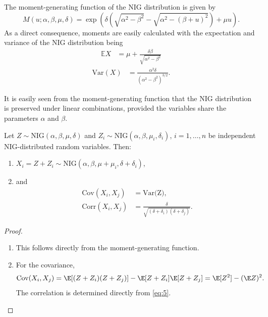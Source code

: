 The moment-generating function of the NIG distribution is given by
\begin{equation*}
  M(u; \alpha, \beta, \mu, \delta) = \exp\left( \delta
    \left(\sqrt{\alpha^2-\beta^2} - \sqrt{\alpha^2 - (\beta +
        u)^2}\right) + \mu u\right). 
\end{equation*}
As a direct consequence, moments are easily calculated with the
expectation and variance of the NIG distribution being
\begin{align*}
  \mathbb E X &= \mu +
                \frac{\delta \beta}{\sqrt{\alpha^2-\beta^2}}
  \end{align*}
\begin{align} \label{eq:5}
  \text{Var}(X) &= \frac{\alpha^2\delta}{(\alpha^2-\beta^2)^{3/2}}.
\end{align}

It is easily seen from the moment-generating function that the NIG distribution is preserved under linear combinations, provided
the variables share the parameters $\alpha$ and $\beta$. 
\begin{proposition}
  \label{prop:NIG}
  Let $Z\sim \text{NIG}(\alpha, \beta, \mu, \delta)$ and
  $Z_i\sim \text{NIG}(\alpha, \beta, \mu_i, \delta_i)$,
  $i=1,\ldots, n$ be independent NIG-distributed random
  variables. Then:
  \begin{enumerate}
  \item  $X_i = Z + Z_i\sim \text{NIG}(\alpha,\beta,\mu+\mu_i,
  \delta+\delta_i)$,
\item and 
  \begin{align}
    \text{Cov}(X_i,X_j) &= \text{Var(Z)},\nonumber\\
    \text{Corr}(X_i,X_j) &= \frac{\delta}{\sqrt{(\delta+\delta_i)
                           (\delta+\delta_j)}}. \label{eq:6}
  \end{align}
\end{enumerate}
\end{proposition}
\begin{proof}
  \begin{enumerate}
  \item This follows directly from the moment-generating function. 
  \item For the covariance,
    \begin{equation*}
      \text{Cov}(X_i,X_j)
      = \E[(Z+Z_i) (Z+Z_j)] - \E[Z+Z_i] \E[Z+Z_j]
      = \E[Z^2] -(\E Z)^2.
    \end{equation*}
    The correlation is determined directly from \ref{eq:5}.
  \end{enumerate}
\end{proof}

